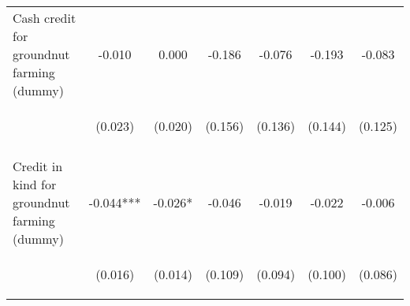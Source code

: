 \begin{center}
\begin{tabular}{lcccccc}
Cash credit for groundnut farming (dummy) & -0.010 & 0.000 & -0.186 & -0.076 & -0.193 & -0.083 \\
 & \begin{footnotesize}(0.023)\end{footnotesize} & \begin{footnotesize}(0.020)\end{footnotesize} & \begin{footnotesize}(0.156)\end{footnotesize} & \begin{footnotesize}(0.136)\end{footnotesize} & \begin{footnotesize}(0.144)\end{footnotesize} & \begin{footnotesize}(0.125)\end{footnotesize} \\
\vspace{4pt} & \begin{footnotesize}[0.663]\end{footnotesize} & \begin{footnotesize}[0.995]\end{footnotesize} & \begin{footnotesize}[0.234]\end{footnotesize} & \begin{footnotesize}[0.573]\end{footnotesize} & \begin{footnotesize}[0.180]\end{footnotesize} & \begin{footnotesize}[0.505]\end{footnotesize} \\
Credit in kind for groundnut farming (dummy) & -0.044*** & -0.026* & -0.046 & -0.019 & -0.022 & -0.006 \\
 & \begin{footnotesize}(0.016)\end{footnotesize} & \begin{footnotesize}(0.014)\end{footnotesize} & \begin{footnotesize}(0.109)\end{footnotesize} & \begin{footnotesize}(0.094)\end{footnotesize} & \begin{footnotesize}(0.100)\end{footnotesize} & \begin{footnotesize}(0.086)\end{footnotesize} \\

\end{tabular}
\end{center}
